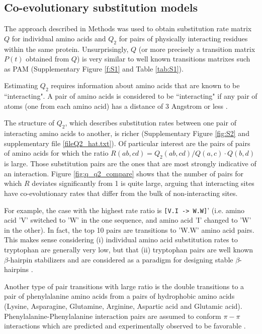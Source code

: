 \subsection{Co-evolutionary substitution models}

The approach described in Methods was used to obtain substitution rate matrix $Q$ for individual amino acids and $Q_2$ for pairs of physically interacting residues within the same protein. Unsurprisingly, $Q$ (or more precisely a transition matrix $P(t)$ obtained from $Q$) is very similar to well known transitions matrixes such as PAM \cite{} (Supplementary Figure \ref{f:S1} and Table \ref{tab:S1}).

Estimating $Q_2$ requires information about amino acids that are known to be “interacting". A pair of amino acids is considered to be “interacting" if any pair of atoms (one from each amino acid) has a distance of 3 Angstrom or less \cite{burger2010disentangling}. 

The structure of $Q_2$, which describes substitution rates between one pair of interacting amino acids to another, is richer (Supplementary Figure \ref{fig:S2} and supplementary file \ref{fileQ2_hat.txt}). Of particular interest are the pairs of pairs of amino acids for which the ratio $R(ab,cd) = Q_2 (ab, cd) / Q(a,c) \cdot Q(b,d)$ is large. Those substitution pairs are the ones that are most strongly indicative of an interaction. Figure \ref{fig:q_q2_compare} shows that the number of pairs for which $R$ deviates significantly from 1 is quite large, arguing that interacting sites have co-evolutionary rates that differ from the bulk of non-interacting sites.

For example, the case with the highest rate ratio is \texttt{[V.I -> W.W]}' (i.e. amino acid 'V' switched to 'W' in the one sequence, and amino acid 'I' changed to 'W' in the other). In fact, the top 10 pairs are transitions to 'W.W' amino acid pairs. This makes sense considering (i) individual amino acid substitution rates to tryptophan are generally very low, but that (ii) tryptophan pairs are well known $\beta$-hairpin stabilizers and are considered as a paradigm for designing stable $\beta$-hairpins \cite{Santiveri2010}.

Another type of pair transitions with large ratio is the double transitions to a pair of phenylalanine amino acids from a pairs of hydrophobic amino acids (Lysine, Asparagine, Glutamine, Arginine, Aspartic acid and Glutamic acid). Phenylalanine-Phenylalanine interaction pairs are assumed to conform $\pi-\pi$ interactions which are predicted and experimentally observed to be favorable \cite{hunter1991pi}.

